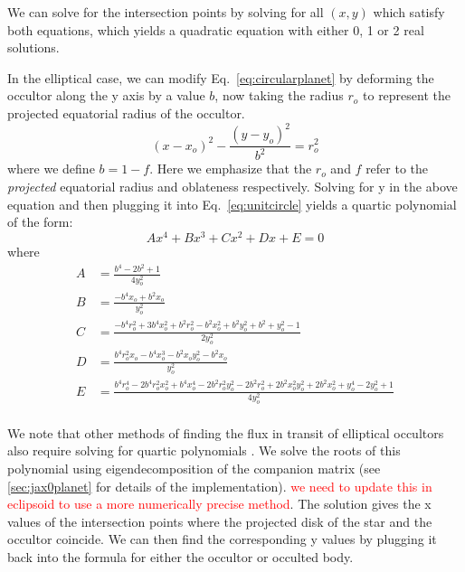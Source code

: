 \documentclass[twocolumn]{aastex631}
\begin{document}
We can solve for the intersection points by solving for all $(x,y)$ which satisfy both equations, which yields a quadratic equation with either 0, 1 or 2 real solutions.

In the elliptical case, we can modify Eq.~\ref{eq:circularplanet} by deforming the occultor along the y axis by a value $b$, now taking the radius $r_o$ to represent the projected equatorial radius of the occultor. 
\begin{equation} \label{eq:ellipticalplanet}
(x-x_{o})^2-\frac{(y-y_o)^2}{b^2} = r_o^2
\end{equation}
where we define $b=1-f$. Here we emphasize that the $r_o$ and $f$ refer to the \textit{projected} equatorial radius and oblateness respectively. 
Solving for y in the above equation and then plugging it into Eq.~\ref{eq:unitcircle} yields a quartic polynomial of the form: 
\begin{equation} \label{eq:quarticform}
Ax^4 + Bx^3 + Cx^2 + Dx + E = 0
\end{equation} 
where
\onecolumngrid
\begin{equation} \label{eq:quarticcoeffs}
\begin{aligned}
A &= \frac{b^4 - 2b^2 + 1}{4y_o^2}\\
B &= \frac{-b^4x_o + b^2x_o}{y_o^2}\\
C &= \frac{-b^4r_o^2 + 3b^4x_o^2 + b^2r_o^2 - b^2x_o^2 + b^2y_o^2 + b^2 + y_o^2 - 1}{2y_o^2} \\
D &= \frac{b^4r_o^2x_o - b^4x_o^3 - b^2x_oy_o^2 - b^2x_o}{y_o^2} \\
E &= \frac{b^4r_o^4 - 2b^4r_o^2x_o^2 + b^4x_o^4 - 2b^2r_o^2y_o^2 - 2b^2r_o^2 + 2b^2x_o^2y_o^2 + 2b^2x_o^2 + y_o^4 - 2y_o^2 + 1}{4y_o^2}\\
\end{aligned}
\end{equation}

\twocolumngrid
We note that other methods of finding the flux in transit of elliptical occultors also require solving for quartic polynomials \citep{rein2023}. We solve the roots of this polynomial using eigendecomposition of the companion matrix (see \ref{sec:jax0planet} for details of the implementation). \textcolor{red}{we need to update this in eclipsoid to use a more numerically precise method}. The solution gives the x values of the intersection points where the projected disk of the star and the occultor coincide. We can then find the corresponding y values by plugging it back into the formula for either the occultor or occulted body. 
\end{document}
